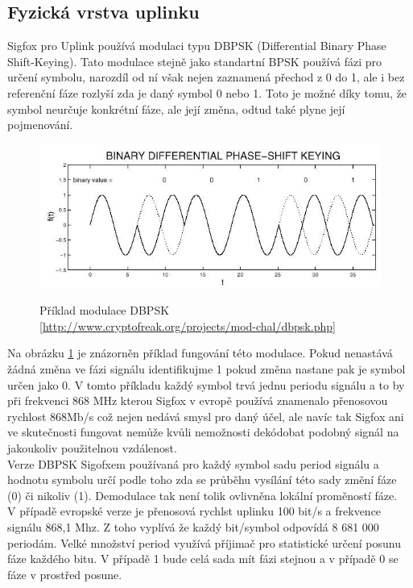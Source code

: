 \documentclass{ctuthesis}
\begin{document}
\subsection{Fyzická vrstva uplinku}
Sigfox pro Uplink používá modulaci typu DBPSK (Differential Binary Phase Shift-Keying). Tato modulace stejně jako standartní BPSK používá fázi pro určení symbolu, narozdíl od ní však nejen zaznamená přechod z 0 do 1, ale i bez referenční fáze rozlyší zda je daný symbol 0 nebo 1. Toto je možné díky tomu, že symbol neurčuje konkrétní fáze, ale její změna, odtud také plyne její pojmenování. \\
\begin{figure}
\caption{Příklad modulace DBPSK \ref{http://www.cryptofreak.org/projects/mod-chal/dbpsk.php}}
\includegraphics[width=1\textwidth]{./images/dbpsk.jpg}
\label{dbpsk}
\end{figure}
Na obrázku \ref{dbpsk} je znázorněn příklad fungování této modulace. Pokud nenastává žádná změna ve fázi signálu identifikujme 1 pokud změna nastane pak je symbol určen jako 0. V tomto příkladu každý symbol trvá jednu periodu signálu a to by při frekvenci 868 MHz kterou Sigfox v evropě používá znamenalo přenosovou rychlost 868Mb/s což nejen nedává smysl pro daný účel, ale navíc tak Sigfox ani ve skutečnosti fungovat nemůže kvůli nemožnosti dekódobat podobný signál na jakoukoliv použitelnou vzdálenost.\\
Verze DBPSK Sigofxem používaná pro každý symbol sadu period signálu a hodnotu symbolu určí podle toho zda se průběhu vysílání této sady změní fáze (0) či nikoliv (1). Demodulace tak není tolik ovlivněna lokální proměností fáze.\\
V případě evropské verze je přenosová rychlst uplinku 100 bit/s a frekvence signálu 868,1 Mhz. Z toho vyplívá že každý bit/symbol odpovídá 8 681 000 periodám. Velké množství period využívá příjimač pro statistické určení posunu fáze každého bitu. V případě 1 bude celá sada mít fázi stejnou a v případě 0 se fáze v prostřed posune. \\
\end{document}
